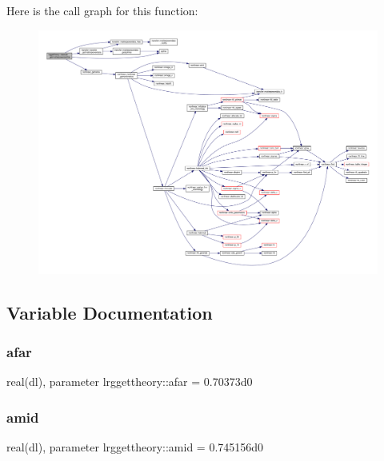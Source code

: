 Here is the call graph for this function\+:
\nopagebreak
\begin{figure}[H]
\begin{center}
\leavevmode
\includegraphics[width=350pt]{namespacelrggettheory_abd8f5f818ab0125d9088ce80da0ca469_cgraph}
\end{center}
\end{figure}


\subsection{Variable Documentation}
\mbox{\label{namespacelrggettheory_aa16430b41b5ca2ad21489fad80db335e}} 
\subsubsection{\texorpdfstring{afar}{afar}}
{\footnotesize\ttfamily real(dl), parameter lrggettheory\+::afar = 0.\+70373d0}

\mbox{\label{namespacelrggettheory_a48262968a1e96ae340aba94f24aec1b5}} 
\subsubsection{\texorpdfstring{amid}{amid}}
{\footnotesize\ttfamily real(dl), parameter lrggettheory\+::amid = 0.\+745156d0}

\mbox{\label{namespacelrggettheory_ad88af273771f3d0810522480b47f084e}} 
